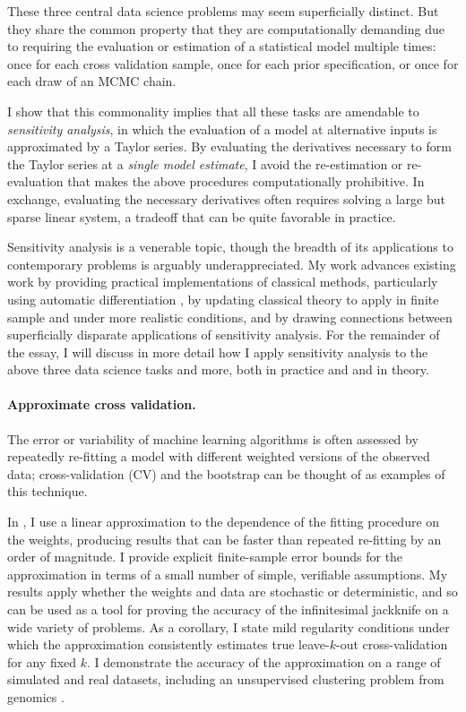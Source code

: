 These three central data science problems may seem superficially distinct.  But
they share the common property that they are computationally demanding due to
requiring the evaluation or estimation of a statistical model multiple times:
once for each cross validation sample, once for each prior specification, or
once for each draw of an MCMC chain.

I show that this commonality implies that all these tasks are amendable to {\em
sensitivity analysis}, in which the evaluation of a model at alternative inputs
is approximated by a Taylor series.  By evaluating the derivatives necessary to
form the Taylor series at a {\em single model estimate}, I avoid the
re-estimation or re-evaluation that makes the above procedures computationally
prohibitive.  In exchange, evaluating the necessary derivatives often requires
solving a large but sparse linear system, a tradeoff that can be quite favorable
in practice.

Sensitivity analysis is a venerable topic, though the breadth of its
applications to contemporary problems is arguably underappreciated.  My work
advances existing work by providing practical implementations of classical
methods, particularly using automatic differentiation
\citep{baydin:2015:automatic}, by updating classical theory to apply in finite
sample and under more realistic conditions, and by drawing connections between
superficially disparate applications of sensitivity analysis. For the remainder
of the essay, I will discuss in more detail how I apply sensitivity analysis to
the above three data science tasks and more, both in practice and and in theory.




\newpage

\paragraph{Approximate cross validation.}

The error or variability of machine learning algorithms is often assessed by
repeatedly re-fitting a model with different weighted versions of the observed
data; cross-validation (CV) and the bootstrap can be thought of as examples of
this technique.

In \citet{giordano:2019:ij}, I use a linear approximation to the
dependence of the fitting procedure on the weights, producing results that can
be faster than repeated re-fitting by an order of magnitude. I provide explicit
finite-sample error bounds for the approximation in terms of a small number of
simple, verifiable assumptions.  My results apply whether the weights and data
are stochastic or deterministic, and so can be used as a tool for proving the
accuracy of the infinitesimal jackknife on a wide variety of problems. As a
corollary, I state mild regularity conditions under which the approximation
consistently estimates true leave-$k$-out cross-validation for any fixed $k$. I
demonstrate the accuracy of the approximation on a range of simulated and real
datasets, including an unsupervised clustering problem from genomics
\citep{Luan:2003:clustering, shoemaker:2015:ultrasensitive}.


